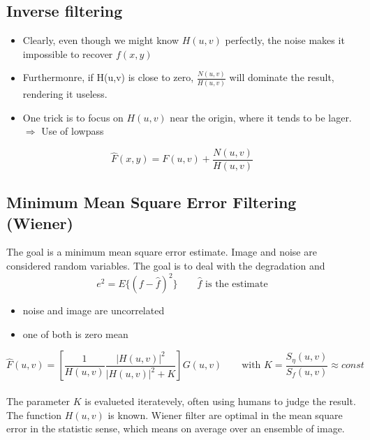 \subsection{Inverse filtering }

\begin{itemize}
	\item Clearly, even though we might know $H(u,v)$ perfectly, the noise makes it impossible to recover $f(x,y)$
	\item Furthermonre, if H(u,v) is close to zero, $\frac{N(u,v)}{H(u,v)}$ will dominate the result, rendering it useless.
	\item One trick is to focus on $H(u,v)$ near the origin, where it tends to be lager. $\Rightarrow$ Use of lowpass
\end{itemize}

\begin{equation}
	\hat{F}(x,y)= F(u,v) + \frac{N(u,v)}{H(u,v)}
\end{equation}


\subsection{Minimum Mean Square Error Filtering (Wiener) }
The goal is a minimum mean square error estimate. Image and noise are considered random variables. The goal is to deal with the degradation and 
\begin{equation}
	e^2 = E\{(f- \hat{f})^2 \} \qquad \hat{f} \text{ is the estimate}
\end{equation}

\begin{itemize}
	\item noise and image are uncorrelated
	\item one of both is zero mean
\end{itemize}

\begin{equation}
	\hat{F}(u,v) = \left[ \frac{1}{H(u,v)} \frac{|H(u,v)|^2}{|H(u,v)|^2 +K} \right] G(u,v) \qquad \textrm{with } K = \frac{S_{\eta}(u,v)}{S_f(u,v)} \approx const
\end{equation}\\

The parameter $K$ is evalueted iteratevely, often using humans to judge the result. The function $H(u,v)$ is known.
 Wiener filter are optimal in the mean square error in the statistic sense, which means on average over an ensemble of image.

